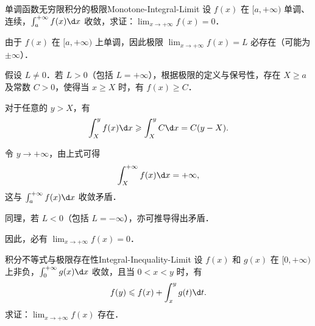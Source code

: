 \begin{problem}{单调函数无穷限积分的极限}{Monotone-Integral-Limit}
    设 $f(x)$ 在 $[a,+\infty)$ 单调、连续，$\int_a^{+\infty} f(x) \d x$ 收敛，求证：$\lim_{x\to+\infty} f(x) = 0$．
\end{problem}

\begin{myproof}
    由于 $f(x)$ 在 $[a, +\infty)$ 上单调，因此极限 $\lim_{x\to +\infty} f(x) = L$ 必存在（可能为 $\pm\infty$）．

    假设 $L \neq 0$．若 $L > 0$（包括 $L = +\infty$），根据极限的定义与保号性，存在 $X \geqslant a$ 及常数 $C > 0$，使得当 $x \geqslant X$ 时，有 $f(x) \geqslant C$．

    对于任意的 $y > X$，有
    \begin{equation}
        \int_{X}^{y} f(x) \d x \geqslant \int_{X}^{y} C \d x = C(y - X).
    \end{equation}

    令 $y \to +\infty$，由上式可得
    \begin{equation}
        \int_{X}^{+\infty} f(x) \d x = +\infty,
    \end{equation}
    这与 $\int_a^{+\infty} f(x) \d x$ 收敛矛盾．

    同理，若 $L < 0$（包括 $L = -\infty$），亦可推导得出矛盾．

    因此，必有 $\lim_{x\to +\infty} f(x) = 0$．
\end{myproof}

\begin{problem}{积分不等式与极限存在性}{Integral-Inequality-Limit}
    设 $f(x)$ 和 $g(x)$ 在 $[0,+\infty)$ 上非负，$\int_0^{+\infty} g(x) \d x$ 收敛，且当 $0 < x < y$ 时，有
    \begin{equation}
        f(y) \leqslant f(x) + \int_x^y g(t) \d t.
    \end{equation}
    求证：$\lim_{x\to+\infty} f(x)$ 存在．
\end{problem}

